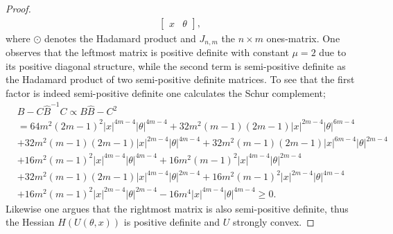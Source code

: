 \documentclass[a4paper, 10pt]{article}
\theoremstyle{plain}%
\begin{document}
\begin{proof}
\begin{align*}
\begin{bmatrix}
x&\theta
\end{bmatrix},
\end{align*}
where $\odot$ denotes the Hadamard product and $J_{n,m}$ the $n\times m$ ones-matrix. One observes that the leftmost matrix is positive definite with constant $\mu=2$ due to its positive diagonal structure, while the second term is semi-positive definite as the Hadamard product of two semi-positive definite matrices. To see that the first factor is indeed semi-positive definite one calculates the Schur complement;
\begin{align*}
    &B-C{\hat{B}}^{-1}C \propto B\hat{B}-C^2\\
    &=64m^2(2m-1)^2|x|^{4m-4}|\theta|^{4m-4}+32m^2(m-1)(2m-1)|x|^{2m-4}|\theta|^{6m-4}\\&+32m^2(m-1)(2m-1)|x|^{2m-4}|\theta|^{4m-4}+32m^2(m-1)(2m-1)|x|^{6m-4}|\theta|^{2m-4}\\&+16m^2(m-1)^2|x|^{4m-4}|\theta|^{4m-4}+16m^2(m-1)^2|x|^{4m-4}|\theta|^{2m-4}\\
    &+32m^2(m-1)(2m-1)|x|^{4m-4}|\theta|^{2m-4}+16m^2(m-1)^2|x|^{2m-4}|\theta|^{4m-4}\\
    &+16m^2(m-1)^2|x|^{2m-4}|\theta|^{2m-4}-16m^4|x|^{4m-4}|\theta|^{4m-4}\geq 0.
\end{align*}
\noindent Likewise one argues that the rightmost matrix is also semi-positive definite, thus the Hessian $H(U(\theta,x))$ is positive definite and $U$ strongly convex.
\end{proof}
\end{document}

